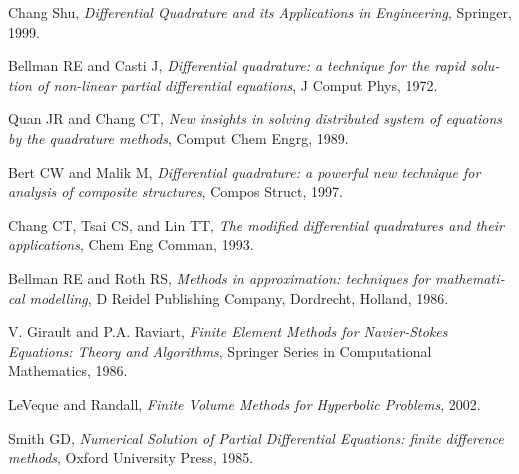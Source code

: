 \documentclass{arabicClass}
\begin{document}
	
	\renewcommand{\theequation}{\arabic{equation}.\arabic{chapter}}
	
	\renewcommand{\arraystretch}{1.3}
	
	\abovedisplayskip=7pt
	\belowdisplayskip=7pt
	
	
	
	
	
	
	
	\tableofcontents
	
	
	
	
	
	
	
	
	
	
			\begin{thebibliography}{99}
\begin{english}

		
		Chang Shu, \textit{Differential Quadrature and its Applications in Engineering}, Springer, 1999.
		
		Bellman RE and Casti J, \textit{Differential quadrature: a technique for the rapid solution of non-linear partial differential equations}, J Comput Phys, 1972.
		
		Quan JR and Chang CT, \textit{New insights in solving distributed system of equations by the quadrature methods}, Comput Chem Engrg, 1989.
		
		Bert CW and Malik M, \textit{Differential quadrature: a powerful new technique for analysis of composite structures}, Compos Struct, 1997.
		
		Chang CT, Tsai CS, and Lin TT, \textit{The modified differential quadratures and their applications}, Chem Eng Comman, 1993.
		
		Bellman RE and Roth RS, \textit{Methods in approximation: techniques for mathematical modelling}, D Reidel Publishing Company, Dordrecht, Holland, 1986.
		
		V. Girault and P.A. Raviart, \textit{Finite Element Methods for Navier-Stokes Equations: Theory and Algorithms}, Springer Series in Computational Mathematics, 1986.
		
		LeVeque and Randall, \textit{Finite Volume Methods for Hyperbolic Problems}, 2002.
		
		Smith GD, \textit{Numerical Solution of Partial Differential Equations: finite difference methods}, Oxford University Press, 1985.
	\end{english}
	\end{thebibliography}

	
\end{document}
